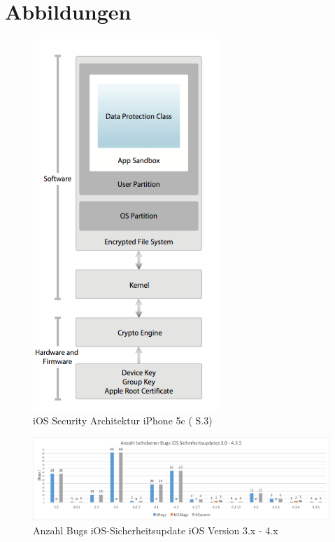 \newpage
\chapter{Abbildungen}

\begin{figure}[htbp!]
    \centering 
		        \includegraphics[scale=0.3]{Bilder/SecArchitektur-iOS7.png}
	\caption {iOS Security Architektur iPhone 5c (\cite{Apple[9]} S.3) } 
    \label{fig:iOSSecurityArchitekturiOS7}
\end{figure}

\begin{figure}[htbp!]
        \centering
                \includegraphics[scale=0.4]{Bilder/iOSSicherheitsupdate3.png}
        \caption{ Anzahl Bugs iOS-Sicherheitsupdate iOS Version 3.x - 4.x  \protect\footnotemark}
        \label{fig:AnalyseiOSSicherheitsupdate3}
\end{figure}

